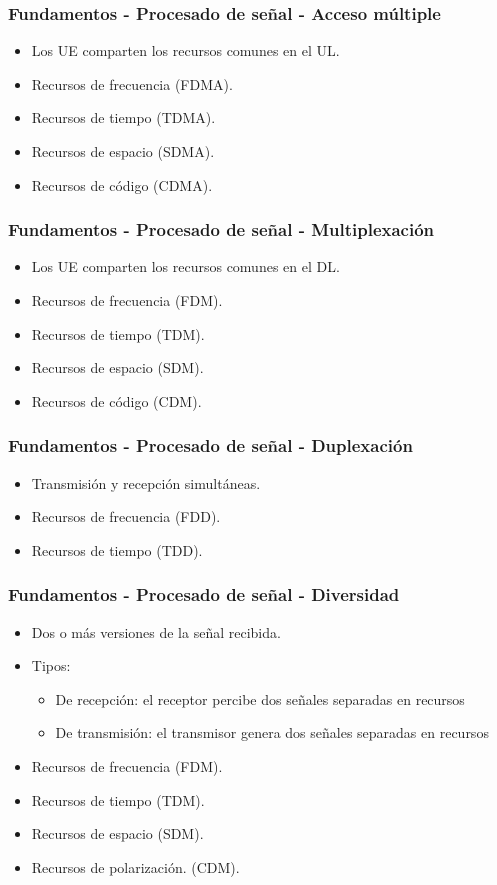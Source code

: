 \documentclass{beamer}
\begin{document}
\begin{frame}
\frametitle{Fundamentos - Procesado de señal - Acceso múltiple}

\begin{itemize}
\item Los UE comparten los recursos comunes en el UL.
\item Recursos de frecuencia (FDMA).
\item Recursos de tiempo (TDMA).
\item Recursos de espacio (SDMA).
\item Recursos de código (CDMA).
\end{itemize}
\end{frame}

\begin{frame}
\frametitle{Fundamentos - Procesado de señal - Multiplexación}

\begin{itemize}
\item Los UE comparten los recursos comunes en el DL.
\item Recursos de frecuencia (FDM).
\item Recursos de tiempo (TDM).
\item Recursos de espacio (SDM).
\item Recursos de código (CDM).
\end{itemize}
\end{frame}

\begin{frame}
\frametitle{Fundamentos - Procesado de señal - Duplexación}

\begin{itemize}
\item Transmisión y recepción simultáneas.
\item Recursos de frecuencia (FDD).
\item Recursos de tiempo (TDD).
\end{itemize}
\end{frame}

\begin{frame}
\frametitle{Fundamentos - Procesado de señal - Diversidad}

\begin{itemize}
\item Dos o más versiones de la señal recibida.
\item {
	Tipos:
	\begin{itemize}
	\item De recepción: el receptor percibe dos señales separadas en recursos
	\item De transmisión: el transmisor genera dos señales separadas en recursos
	\end{itemize}
}
\item Recursos de frecuencia (FDM).
\item Recursos de tiempo (TDM).
\item Recursos de espacio (SDM).
\item Recursos de polarización. (CDM).
\end{itemize}
\end{frame}
\end{document}
